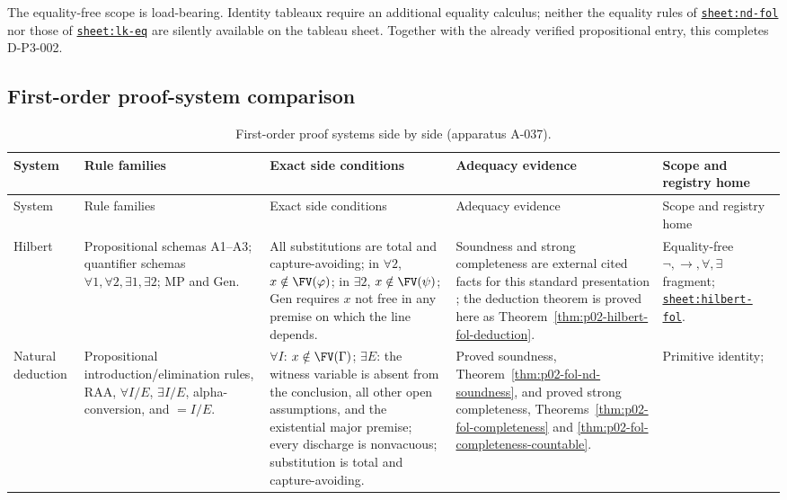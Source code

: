 The equality-free scope is load-bearing.  Identity tableaux require an
additional equality calculus; neither the equality rules of
\hyperref[sheet:nd-fol]{\texttt{sheet:nd-fol}} nor those of
\hyperref[sheet:lk-eq]{\texttt{sheet:lk-eq}} are silently available
on the tableau sheet.  Together with the already verified propositional entry,
this completes D-P3-002.

\begin{landscape}
\section{First-order proof-system comparison}
\label{sec:p02-fol-calculi-comparison}

\begingroup\scriptsize\setlength{\tabcolsep}{3pt}
\begin{longtable}{@{}p{.65in}p{1.35in}p{1.95in}p{1.90in}p{1.25in}@{}}
\caption{First-order proof systems side by side (apparatus A-037).}
\label{tab:p02-fol-proof-systems}\\
\toprule
System & Rule families & Exact side conditions & Adequacy evidence & Scope and registry home \\ \midrule
\endfirsthead
\toprule
System & Rule families & Exact side conditions & Adequacy evidence & Scope and registry home \\ \midrule
\endhead
Hilbert & Propositional schemas A1--A3; quantifier schemas
\(\forall1,\forall2,\exists1,\exists2\); MP and Gen. & All substitutions are
total and capture-avoiding; in \(\forall2\), \(x\notin\FV(\varphi)\); in
\(\exists2\), \(x\notin\FV(\psi)\); Gen requires \(x\) not free in any
premise on which the line depends. & Soundness and strong completeness are
external cited facts for this standard presentation \cite{Mendelson1997}; the
deduction theorem is proved here as
Theorem~\ref{thm:p02-hilbert-fol-deduction}. & Equality-free
\(\neg,\to,\forall,\exists\) fragment;
\hyperref[sheet:hilbert-fol]{\texttt{sheet:hilbert-fol}}. \\
Natural deduction & Propositional introduction/elimination rules, RAA,
\(\forall I/E\), \(\exists I/E\), alpha-conversion, and \(=I/E\). &
\(\forall I\): \(x\notin\FV(\Gamma)\); \(\exists E\): the witness variable is
absent from the conclusion, all other open assumptions, and the existential
major premise; every discharge is nonvacuous; substitution is total and
capture-avoiding. & Proved soundness,
Theorem~\ref{thm:p02-fol-nd-soundness}, and proved strong completeness,
Theorems~\ref{thm:p02-fol-completeness} and
\ref{thm:p02-fol-completeness-countable}. & Primitive identity;

\end{longtable}
\end{landscape}
